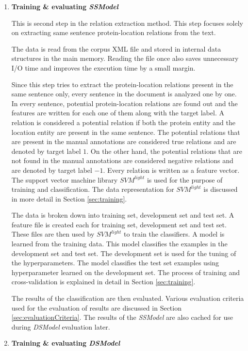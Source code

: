 \begin{enumerate}
\item \textbf{Training \& evaluating \textit{SSModel}}

This is second step in the relation extraction method. This step focuses solely on extracting same sentence protein-location relations from the text.

The data is read from the corpus XML file and stored in internal data structures in the main memory. Reading the file once also saves unnecessary I/O time and improves the execution time by a small margin.

Since this step tries to extract the protein-location relations present in the same sentence only, every sentence in the document is analyzed one by one. In every sentence, potential protein-location relations are found out and the features are written for each one of them along with the target label. A relation is considered a potential relation if both the protein entity and the location entity are present in the same sentence. The potential relations that are present in the manual annotations are considered true relations and are denoted by target label $1$. On the other hand, the potential relations that are not found in the manual annotations are considered negative relations and are denoted by target label $-1$. Every relation is written as a feature vector. The support vector machine library $SVM^{light}$ \cite{joachims1999making} is used for the purpose of training and classification.  The data representation for $SVM^{light}$ is discussed in more detail in Section \ref{sec:training}.

The data is broken down into training set, development set and test set. A feature file is created each for training set, development set and test set. These files are then used by $SVM^{light}$ to train the classifiers. A model is learned from the training data. This model classifies the examples in the development set and test set. The development set is used for the tuning of the hyperparameters. The model classifies the test set examples using hyperparameter learned on the development set. The process of training and cross-validation is explained in detail in Section \ref{sec:training}.

The results of the classification are then evaluated. Various evaluation criteria used for the evaluation of results are discussed in Section \ref{sec:evaluationCriteria}. The results of the \textit{SSModel} are also cached for use during \textit{DSModel} evaluation later.

\item \textbf{Training \& evaluating \textit{DSModel}}


\end{enumerate}
